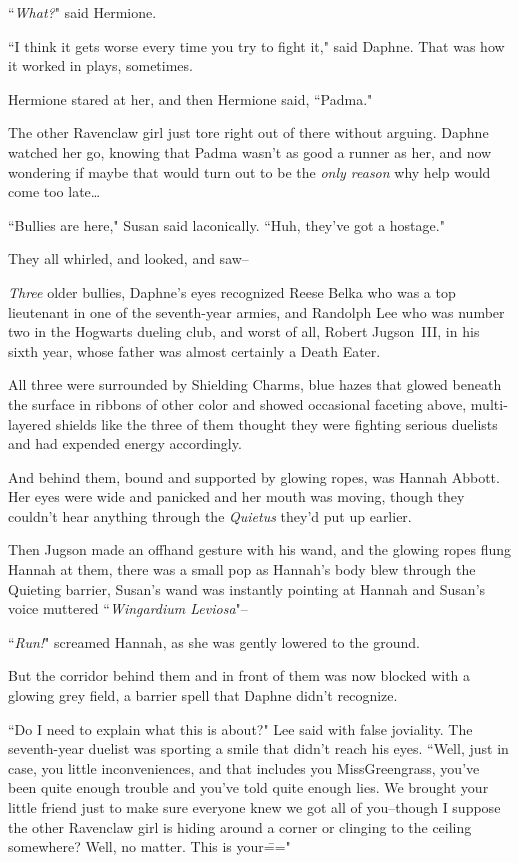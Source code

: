 ``\emph{What?}" said Hermione.

``I think it gets worse every time you try to fight it," said Daphne. That was how it worked in plays, sometimes.

Hermione stared at her, and then Hermione said, ``Padma."

The other Ravenclaw girl just tore right out of there without arguing. Daphne watched her go, knowing that Padma wasn't as good a runner as her, and now wondering if maybe that would turn out to be the \emph{only reason} why help would come too late{\ldots}

``Bullies are here," Susan said laconically. ``Huh, they've got a hostage."

They all whirled, and looked, and saw\---

\emph{Three} older bullies, Daphne's eyes recognized Reese Belka who was a top lieutenant in one of the seventh-year armies, and Randolph Lee who was number two in the Hogwarts dueling club, and worst of all, Robert Jugson~III, in his sixth year, whose father was almost certainly a Death Eater.

All three were surrounded by Shielding Charms, blue hazes that glowed beneath the surface in ribbons of other color and showed occasional faceting above, multi-layered shields like the three of them thought they were fighting serious duelists and had expended energy accordingly.

And behind them, bound and supported by glowing ropes, was Hannah Abbott. Her eyes were wide and panicked and her mouth was moving, though they couldn't hear anything through the \emph{Quietus} they'd put up earlier.

Then Jugson made an offhand gesture with his wand, and the glowing ropes flung Hannah at them, there was a small pop as Hannah's body blew through the Quieting barrier, Susan's wand was instantly pointing at Hannah and Susan's voice muttered ``\emph{Wingardium Leviosa}"\---

``\emph{Run!}" screamed Hannah, as she was gently lowered to the ground.

But the corridor behind them and in front of them was now blocked with a glowing grey field, a barrier spell that Daphne didn't recognize.

``Do I need to explain what this is about?" Lee said with false joviality. The seventh-year duelist was sporting a smile that didn't reach his eyes. ``Well, just in case, you little inconveniences, and that includes you Miss\?Greengrass, you've been quite enough trouble and you've told quite enough lies. We brought your little friend just to make sure everyone knew we got all of you\---though I suppose the other Ravenclaw girl is hiding around a corner or clinging to the ceiling somewhere? Well, no matter. This is your\==="

